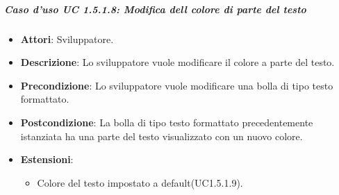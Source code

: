 \subparagraph{Caso d'uso UC 1.5.1.8: Modifica dell colore di parte del testo}


\FloatBarrier
\begin{itemize}
\item\textbf{Attori}: Sviluppatore.
\item\textbf{Descrizione}: Lo sviluppatore vuole modificare il colore a parte del testo.
\item\textbf{Precondizione}: Lo sviluppatore vuole modificare una bolla di tipo testo formattato.
\item\textbf{Postcondizione}: La bolla di tipo testo formattato precedentemente istanziata ha una parte del testo visualizzato con un nuovo colore.
\item\textbf{Estensioni}: 
\begin{itemize}

\item Colore del testo impostato a default(UC1.5.1.9).

\end{itemize}

\end{itemize}

